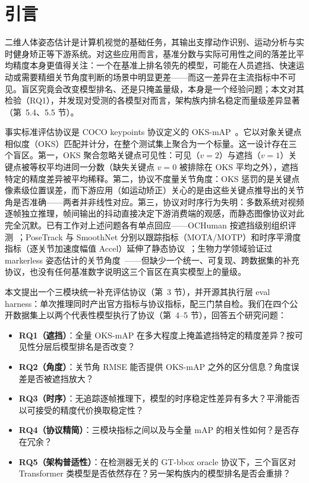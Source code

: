 \documentclass[10pt,conference]{IEEEtran}
\begin{document}
\section{引言}

二维人体姿态估计是计算机视觉的基础任务，其输出支撑动作识别、运动分析与实时健身矫正等下游系统。对这些应用而言，基准分数与实际可用性之间的落差比平均精度本身更值得关注：一个在基准上排名领先的模型，可能在人员遮挡、快速运动或需要精细关节角度判断的场景中明显更差——而这一差异在主流指标中不可见。盲区究竟会改变模型排名、还是只掩盖量级，本身是一个经验问题；本文对其检验（RQ1），并发现对受测的各模型对而言，架构族内排名稳定而量级差异显著（第~5.4、5.5 节）。

事实标准评估协议是 COCO keypoints 协议定义的 OKS-mAP~\cite{1}。它以对象关键点相似度（OKS）匹配并计分，在整个测试集上聚合为一个标量。这一设计存在三个盲区。第一，OKS 聚合忽略关键点可见性：可见（$v{=}2$）与遮挡（$v{=}1$）关键点被等权平均进同一分数（缺失关键点 $v{=}0$ 被排除在 OKS 平均之外），遮挡特定的精度差异被平均稀释。第二，协议不度量关节角度：OKS 惩罚的是关键点像素级位置误差，而下游应用（如运动矫正）关心的是由这些关键点推导出的关节角是否准确——两者并非线性对应。第三，协议对时序行为失明：多数系统对视频逐帧独立推理，帧间输出的抖动直接决定下游消费端的观感，而静态图像协议对此完全沉默。已有工作对上述问题各有单点回应——OCHuman 按遮挡级别组织评测~\cite{2}；PoseTrack 与 SmoothNet 分别以跟踪指标（MOTA/MOTP）和时序平滑度指标（逐关节加速度幅值 Accel）延伸了静态协议~\cite{3,15}；生物力学领域验证过 markerless 姿态估计的关节角度~\cite{4,5,6}——但缺少一个统一、可复现、跨数据集的补充协议，也没有任何基准数字说明这三个盲区在真实模型上的量级。

本文提出一个三模块统一补充评估协议（第~3 节），并开源其执行层 eval harness：单次推理同时产出官方指标与协议指标，配三门禁自检。我们在四个公开数据集上以两个代表性模型执行了协议（第~4--5 节），回答五个研究问题：

\begin{itemize}
\item \textbf{RQ1（遮挡）}：全量 OKS-mAP 在多大程度上掩盖遮挡特定的精度差异？按可见性分层后模型排名是否改变？
\item \textbf{RQ2（角度）}：关节角 RMSE 能否提供 OKS-mAP 之外的区分信息？角度误差是否被遮挡放大？
\item \textbf{RQ3（时序）}：无追踪逐帧推理下，模型的时序稳定性差异有多大？平滑能否以可接受的精度代价换取稳定性？
\item \textbf{RQ4（协议精简）}：三模块指标之间以及与全量 mAP 的相关性如何？是否存在冗余？
\item \textbf{RQ5（架构普适性）}：在检测器无关的 GT-bbox oracle 协议下，三个盲区对 Transformer 类模型是否依然存在？另一架构族内的模型排名是否会重排？
\end{itemize}
\end{document}
